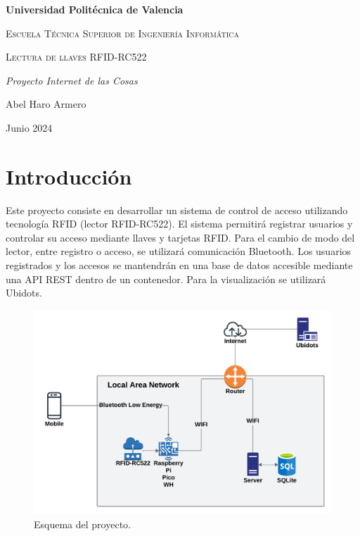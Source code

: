 \documentclass{article}
\begin{document}
\begin{titlepage}
\centering
{\bfseries\LARGE Universidad Politécnica de Valencia\par}
\vspace{1cm}
{\scshape\Large Escuela Técnica Superior de Ingeniería Informática\par}
\vspace{3cm}
{\scshape\Huge Lectura de llaves RFID-RC522 \par}
\vspace{3cm}
{\itshape\Large Proyecto Internet de las Cosas\par}
\vfill
{\Large Abel Haro Armero \par}
\vfill
{\Large Junio 2024 \par}
\date{}
\end{titlepage}



\tableofcontents


\section{Introducción}

Este proyecto consiste en desarrollar un sistema de control de acceso utilizando tecnología RFID (lector RFID-RC522). El sistema permitirá registrar usuarios y controlar su acceso mediante llaves y tarjetas RFID. Para el cambio de modo del lector, entre registro o acceso, se utilizará comunicación Bluetooth. Los usuarios registrados y los accesos se mantendrán en una base de datos accesible mediante una API REST dentro de un contenedor. Para la visualización se utilizará Ubidots.

\begin{figure}[h]
\centering
\includegraphics[width=1\linewidth]{../images/esquema_proyecto.png}
\caption{\label{fig:esquema red}Esquema del proyecto.}
\end{figure}
\end{document}
